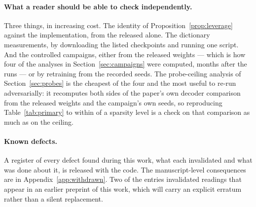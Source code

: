 \paragraph{What a reader should be able to check independently.} Three things, in increasing cost.
The identity of Proposition~\ref{prop:leverage} against the implementation, from the released
 alone. The dictionary measurements, by downloading the
listed checkpoints and running one script. And the controlled campaigns, either from the released
weights --- which is how four of the analyses in Section~\ref{sec:campaigns} were computed, months
after the runs --- or by retraining from the recorded seeds. The probe-ceiling analysis of
Section~\ref{sec:probes} is the cheapest of the four and the most useful to re-run adversarially: it
recomputes both sides of the paper's own decoder comparison from the released weights and the
campaign's own seeds, so reproducing Table~\ref{tab:primary} to within \CeilReproMaxDelta{} of a
sparsity level is a check on that comparison as much as on the ceiling.

\paragraph{Known defects.} A register of every defect found during this work, what each invalidated
and what was done about it, is released with the code. The manuscript-level consequences are in
Appendix~\ref{app:withdrawn}. Two of the entries invalidated readings that appear in an earlier
preprint of this work, which will carry an explicit erratum rather than a silent replacement.
